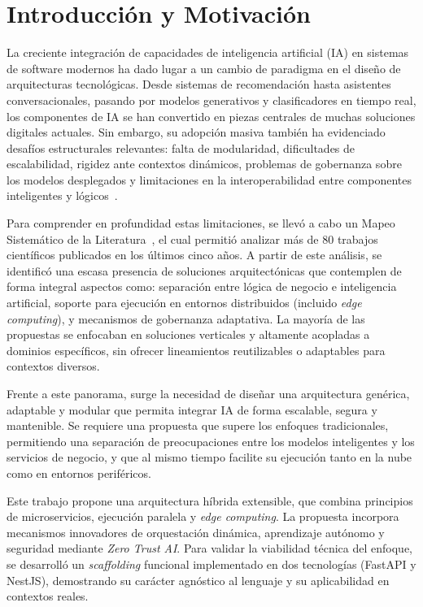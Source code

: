 \documentclass[a4paper]{llncs}
\begin{document}
\section{Introducción y Motivación}

La creciente integración de capacidades de inteligencia artificial (IA) en sistemas de software modernos ha dado lugar a un cambio de paradigma en el diseño de arquitecturas tecnológicas. Desde sistemas de recomendación hasta asistentes conversacionales, pasando por modelos generativos y clasificadores en tiempo real, los componentes de IA se han convertido en piezas centrales de muchas
soluciones digitales actuales. Sin embargo, su adopción masiva también ha evidenciado desafíos estructurales relevantes: falta de modularidad, dificultades de escalabilidad, rigidez ante contextos dinámicos, problemas de gobernanza sobre los modelos desplegados y limitaciones en la interoperabilidad entre componentes inteligentes y lógicos~\cite{amershi2019software,schlegel2022artifact}.

Para comprender en profundidad estas limitaciones, se llevó a cabo un Mapeo Sistemático de la Literatura~\cite{chayle2024msl}, el cual permitió analizar más de 80 trabajos científicos publicados en los últimos cinco años. A partir de este análisis, se identificó una escasa presencia de soluciones arquitectónicas que contemplen de forma integral aspectos como: separación entre lógica de negocio e inteligencia artificial, soporte para ejecución en entornos distribuidos (incluido \emph{edge computing}), y mecanismos de gobernanza adaptativa. La mayoría de las propuestas se enfocaban en soluciones verticales y altamente acopladas a dominios específicos, sin ofrecer lineamientos reutilizables o adaptables para contextos diversos.

Frente a este panorama, surge la necesidad de diseñar una arquitectura genérica, adaptable y modular que permita integrar IA de forma escalable, segura y mantenible. Se requiere una propuesta que supere los enfoques tradicionales, permitiendo una separación de preocupaciones entre los modelos inteligentes y los servicios de negocio, y que al mismo tiempo facilite su ejecución tanto en la nube como en entornos periféricos.

Este trabajo propone una arquitectura híbrida extensible, que combina principios de microservicios, ejecución paralela y \emph{edge computing}. La propuesta incorpora mecanismos innovadores de orquestación dinámica, aprendizaje autónomo y seguridad mediante \emph{Zero Trust AI}. Para validar la viabilidad técnica del enfoque, se desarrolló un \emph{scaffolding} funcional implementado en dos tecnologías (FastAPI y NestJS), demostrando su carácter agnóstico al lenguaje y su aplicabilidad en contextos reales.
\end{document}
